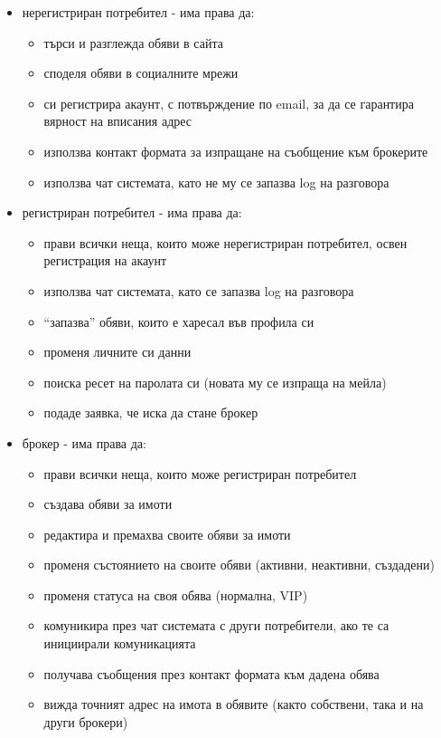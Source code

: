 \documentclass[]{article}
\begin{document}
\begin{enumerate}[I.]
{\begin{enumerate}[1.]
{				\begin{itemize}
					\item {нерегистриран потребител - има права да:
						\begin{itemize}
							\item търси и разглежда обяви в сайта
							\item споделя обяви в социалните мрежи
							\item си регистрира акаунт, с потвърждение по email, за да се гарантира вярност на вписания адрес
							\item използва контакт формата за изпращане на съобщение към брокерите
							\item използва чат системата, като не му се запазва log на разговора
						\end{itemize}
					}
					\item {регистриран потребител - има права да:
						\begin{itemize}
							\item прави всички неща, които може нерегистриран потребител, освен регистрация на акаунт
							\item използва чат системата, като се запазва log на разговора
							\item ``запазва'' обяви, които е харесал във профила си
							\item променя личните си данни
							\item поиска ресет на паролата си (новата му се изпраща на мейла)
							\item подаде заявка, че иска да стане брокер
						\end{itemize}
					}
					\item {брокер - има права да:
						\begin{itemize}
							\item прави всички неща, които може регистриран потребител
							\item създава обяви за имоти
							\item редактира и премахва своите обяви за имоти
							\item променя състоянието на своите обяви (активни, неактивни, създадени)
							\item променя статуса на своя обява (нормална, VIP)
							\item комуникира през чат системата с други потребители, ако те са инициирали комуникацията
							\item получава съобщения през контакт формата към дадена обява
							\item вижда точният адрес на имота в обявите (както собствени, така и на други брокери)

\end{itemize}}
\end{itemize}}
\end{enumerate}}
\end{enumerate}
\end{document}
